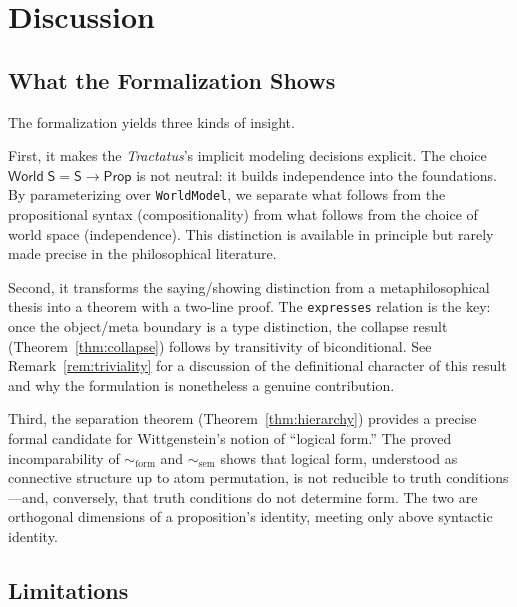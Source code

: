 \documentclass[10pt, letterpaper]{article}
\theoremstyle{definition}
\theoremstyle{remark}
\newcommand{\Sach}{\mathsf{S}}
\newcommand{\World}{\mathsf{World}}
\newcommand{\Prop}{\mathsf{Prop}}
\newcommand{\formEq}{\sim_{\mathrm{form}}}
\newcommand{\semEq}{\sim_{\mathrm{sem}}}
\begin{document}
\section{Discussion}
\label{sec:discussion}

\subsection{What the Formalization Shows}
\label{sec:shows}

The formalization yields three kinds of insight.

First, it makes the \emph{Tractatus}'s implicit modeling
decisions explicit.  The choice $\World\;\Sach = \Sach \to
\Prop$ is not neutral: it builds independence into the
foundations.  By parameterizing over \texttt{WorldModel}, we
separate what follows from the propositional syntax (compositionality)
from what follows from the choice of world space (independence).
This distinction is available in principle but rarely made
precise in the philosophical literature.

Second, it transforms the saying/showing distinction from a
metaphilosophical thesis into a theorem with a two-line proof.
The \texttt{expresses} relation is the key: once the
object/meta boundary is a type distinction, the collapse result
(Theorem~\ref{thm:collapse}) follows by transitivity of
biconditional.  See Remark~\ref{rem:triviality} for a
discussion of the definitional character of this result and
why the formulation is nonetheless a genuine contribution.

Third, the separation theorem (Theorem~\ref{thm:hierarchy})
provides a precise formal candidate for Wittgenstein's
notion of ``logical form.''  The proved incomparability of
$\formEq$ and $\semEq$ shows that logical form, understood as
connective structure up to atom permutation, is not reducible to
truth conditions---and, conversely, that truth conditions do not
determine form.  The two are orthogonal dimensions of a
proposition's identity, meeting only above syntactic identity.

\subsection{Limitations}
\label{sec:limitations}
\end{document}
